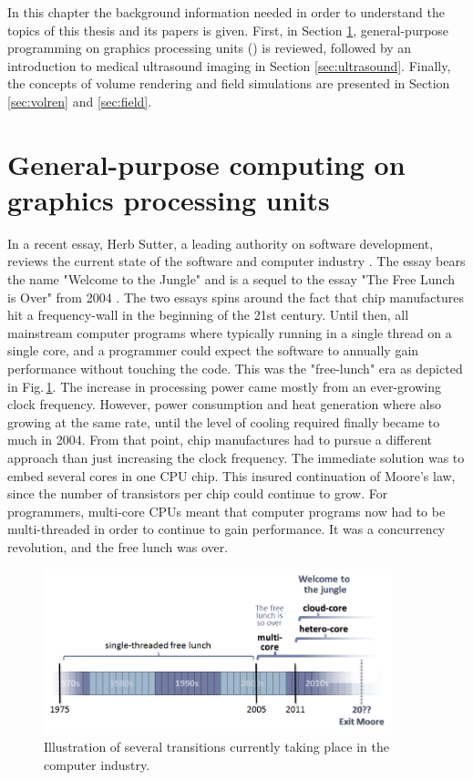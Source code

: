 %

In this chapter the background information needed in order to understand the topics of this thesis and its papers is given. First, in Section \ref{sec:gpgpu}, general-purpose programming on graphics processing units () is reviewed, followed by an introduction to medical ultrasound imaging in Section \ref{sec:ultrasound}. Finally, the concepts of volume rendering and field simulations are presented in Section \ref{sec:volren} and \ref{sec:field}.

\section{General-purpose computing on graphics processing units}\label{sec:gpgpu}
In a recent essay, Herb Sutter, a leading authority on software development, reviews the current state of the software and computer industry \cite{HerbSutter}. The essay bears the name "Welcome to the Jungle" and is a sequel to the essay "The Free Lunch is Over" from 2004 \cite{HerbSuttera}. The two essays spins around the fact that chip manufactures hit a frequency-wall in the beginning of the 21st century. Until then, all mainstream computer programs where typically running in a single thread on a single core, and a programmer could expect the software to annually gain performance without touching the code. This was the "free-lunch" era as depicted in Fig.\,\ref{fig:jungle}. The increase in processing power came mostly from an ever-growing clock frequency. However, power consumption and heat generation where also growing at the same rate, until the level of cooling required finally became to much in 2004.  From that point, chip manufactures had to pursue a different approach  than just increasing the clock frequency. The immediate solution was to embed several cores in one CPU chip. This insured continuation of Moore's law, since the number of transistors per chip could continue to grow. For programmers, multi-core CPUs meant that computer programs now had to be multi-threaded in order to continue to gain performance. It was a concurrency revolution, and  the free lunch was over.

\begin{figure}
\centering
\includegraphics[width=0.9\textwidth]{img/free_lunsh.png}
\caption{Illustration of several transitions currently taking place in the computer industry. }
\label{fig:jungle}
\end{figure}

